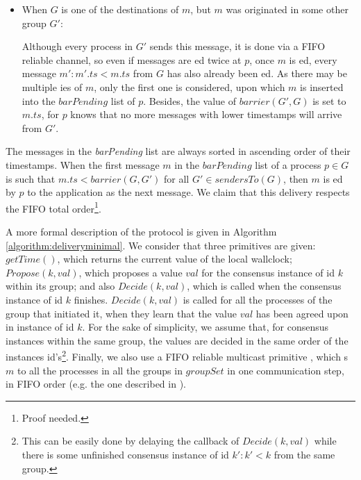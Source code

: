 \documentclass[times, 10pt]{article}
\begin{document}
\begin{itemize}
  \item When $G$ is one of the destinations of $m$, but $m$ was originated in some other group $G'$:
    
  Although every process in $G'$ sends this message, it is done via a FIFO reliable channel, so even if messages are \rmd{}ed twice at $p$, once $m$ is \rmd{}ed, every message $m' : m'.ts < m.ts$ from $G$ has also already been \rmd{}ed. As there may be multiple \rmd{}ies of $m$, only the first one is considered, upon which $m$ is inserted into the $barPending$ list of $p$. Besides, the value of $barrier(G',G)$ is set to $m.ts$, for $p$ knows that no more messages with lower timestamps will arrive from $G'$.
  
\end{itemize}

The messages in the \textit{barPending} list are always sorted in ascending order of their timestamps. When the first message $m$ in the $barPending$ list of a process $p \in G$ is such that $m.ts < barrier(G, G')$ for all $G' \in sendersTo(G)$, then $m$ is \cons{}ed by $p$ to the application as the next message. We claim that this delivery respects the FIFO total order\footnote{Proof needed.}.


A more formal description of the protocol is given in Algorithm \ref{algorithm:deliveryminimal}. We consider that three primitives are given: $getTime()$, which returns the current value of the local wallclock; $Propose(k, val)$, which proposes a value $val$ for the consensus instance of id $k$ within its group; and also $Decide(k, val)$, which is called when the consensus instance of id $k$ finishes. $Decide(k, val)$ is called for all the processes of the group that initiated it, when they learn that the value $val$ has been agreed upon in instance of id $k$. For the sake of simplicity, we assume that, for consensus instances within the same group, the values are decided in the same order of the instances id's\footnote{This can be easily done by delaying the callback of $Decide(k, val)$ while there is some unfinished consensus instance of id $k': k' < k$ from the same group.}. Finally, we also use a FIFO reliable multicast primitive , which \rmd{}s $m$ to all the processes in all the groups in $groupSet$ in one communication step, in FIFO order (e.g. the one described in \cite{ufrmcast1delta}).
\end{document}
